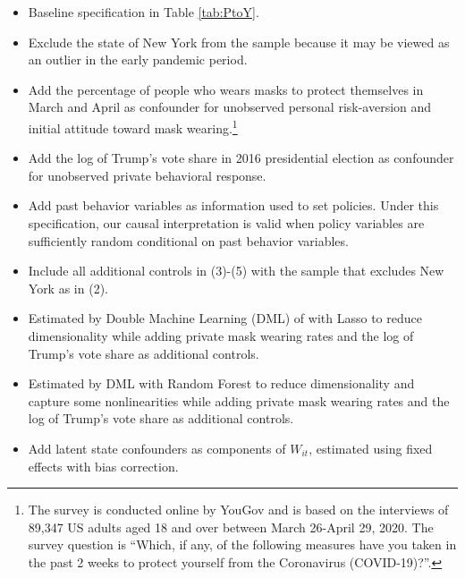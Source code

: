 \documentclass[11pt,reqno,letter]{amsart}
\theoremstyle{definition}
\begin{document}
  \begin{itemize}
  \item[(1)] Baseline specification  in Table  \ref{tab:PtoY}.
  \item[(2)]  Exclude  the state of New York from the sample because it may be viewed as an outlier in the early pandemic period.
  \item[(3)]   Add  the percentage of people who wears masks to protect themselves in March and April as confounder for unobserved  personal risk-aversion and initial attitude toward mask wearing.\footnote{ The survey is conducted online by YouGov and is based on the interviews of 89,347 US adults aged 18 and over between March 26-April 29, 2020.  The survey question is ``Which, if any, of the following measures have you taken in the past 2 weeks to protect yourself from the Coronavirus (COVID-19)?''.}  
   \item[(4)]   Add the log of Trump's vote share  in 2016 presidential election as confounder for unobserved private behavioral response.
   \item[(5)]   Add  past behavior variables  as information used to set policies. Under this specification, our causal interpretation is valid when policy variables are sufficiently random conditional on past behavior variables.
   \item[(6)]   Include all additional controls in (3)-(5) with the sample that excludes New York as in (2).
   \item[(7)]   Estimated by Double Machine Learning (DML) of \cite{chernozhukov18} with Lasso to reduce dimensionality while adding private mask wearing rates and  the log of Trump's vote share as additional controls.   \item[(8)]  Estimated by DML with Random Forest to reduce dimensionality  and capture some nonlinearities while adding private mask wearing rates and  the log of Trump's vote share as additional controls.   
   \item[(9)]   Add latent state confounders as components of $W_{it}$, estimated using fixed effects with bias correction.
  \end{itemize} 
\end{document}
